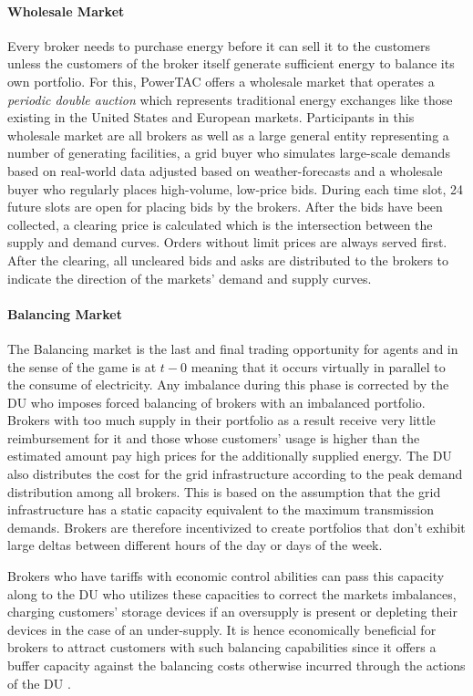 \paragraph{Wholesale Market}
Every broker needs to purchase energy before it can sell it to the customers unless the customers of the broker itself
generate sufficient energy to balance its own portfolio. For this, \ac{PowerTAC} offers a wholesale market that operates
a \emph{periodic double auction} which represents traditional energy exchanges like those existing in the United States
and European markets. Participants in this wholesale market are all brokers as well as a large general entity
representing a number of generating facilities, a grid buyer who simulates large-scale demands based on real-world data
adjusted based on weather-forecasts and a wholesale buyer who regularly places high-volume, low-price bids. During each
time slot, 24 future slots are open for placing bids by the brokers. After the bids have been collected, a clearing
price is calculated which is the intersection between the supply and demand curves. Orders without limit prices are
always served first. After the clearing, all uncleared bids and asks are distributed to the brokers to indicate the
direction of the markets' demand and supply curves.

\paragraph{Balancing Market} The Balancing market is the last and final trading opportunity for agents and in the
sense of the game is at $t-0$ meaning that it occurs virtually in parallel to the consume of electricity. Any imbalance
during this phase is corrected by the \ac{DU} who imposes forced balancing of brokers with an imbalanced
portfolio. Brokers with too much supply in their portfolio as a result receive very little reimbursement for it and those
whose customers' usage is higher than the estimated amount pay high prices for the additionally supplied energy. The
\ac{DU} also distributes the cost for the grid infrastructure according to the peak demand distribution among all
brokers. This is based on the assumption that the grid infrastructure has a static capacity equivalent to the maximum
transmission demands. Brokers are therefore incentivized to create portfolios that don't exhibit large deltas between
different hours of the day or days of the week.

Brokers who have tariffs with economic control abilities can pass this capacity along to the \ac{DU} who utilizes these
capacities to correct the markets imbalances, charging customers' storage devices if an oversupply is present or
depleting their devices in the case of an under-supply. It is hence economically beneficial for brokers to attract
customers with such balancing capabilities since it offers a buffer capacity against the balancing costs otherwise
incurred through the actions of the \ac{DU} \citep[p.5]{ketter2018powertac}.

